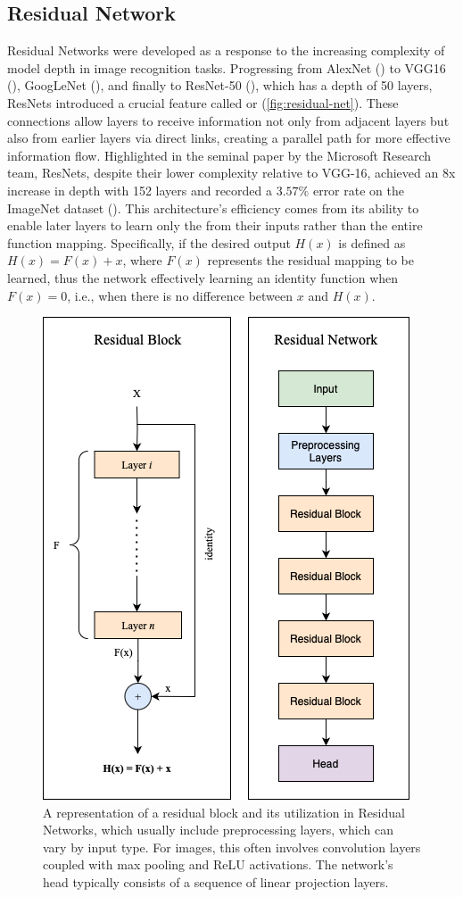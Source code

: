 \subsection{Residual Network} \label{subsec:residual}

\noindent Residual Networks were developed as a response to the increasing complexity of model depth in image recognition tasks. Progressing from AlexNet (\textcolor{deepblue}{\cite{AlexNet}}) to VGG16 (\textcolor{deepblue}{\cite{simonyan2015deep}}), GoogLeNet (\textcolor{deepblue}{\cite{szegedy2014going}}), and finally to ResNet-50 (\textcolor{deepblue}{\cite{he2015deep}}), which has a depth of 50 layers, ResNets introduced a crucial feature called  or  (\textcolor{deepblue}{\autoref{fig:residual-net}}). These connections allow layers to receive information not only from adjacent layers but also from earlier layers via direct links, creating a parallel path for more effective information flow. Highlighted in the seminal paper by the Microsoft Research team, ResNets, despite their lower complexity relative to VGG-16, achieved an 8x increase in depth with 152 layers and recorded a $3.57\%$ error rate on the ImageNet dataset (\textcolor{deepblue}{\cite{he2015deep}}). This architecture's efficiency comes from its ability to enable later layers to learn only the  from their inputs rather than the entire function mapping. Specifically, if the desired output $H(x)$ is defined as $H(x)=F(x) + x$, where $F(x)$ represents the residual mapping to be learned, thus the network effectively learning an identity function when $F(x)=0$, i.e., when there is no difference between $x$ and $H(x)$.

\bigskip

\begin{figure}[htbp]
    \centering
    \includegraphics[width=0.45\linewidth]{images/methods_mono/residuals/residual_net.png}
    \captionsetup{justification=justified, singlelinecheck=false, width=1\linewidth, labelfont=bf} 
    \caption[]{A representation of a residual block and its utilization in Residual Networks, which usually include preprocessing layers, which can vary by input type. For images, this often involves convolution layers coupled with max pooling and ReLU activations. The network's head typically consists of a sequence of linear projection layers.}
    \label{fig:residual-net}
\end{figure}


